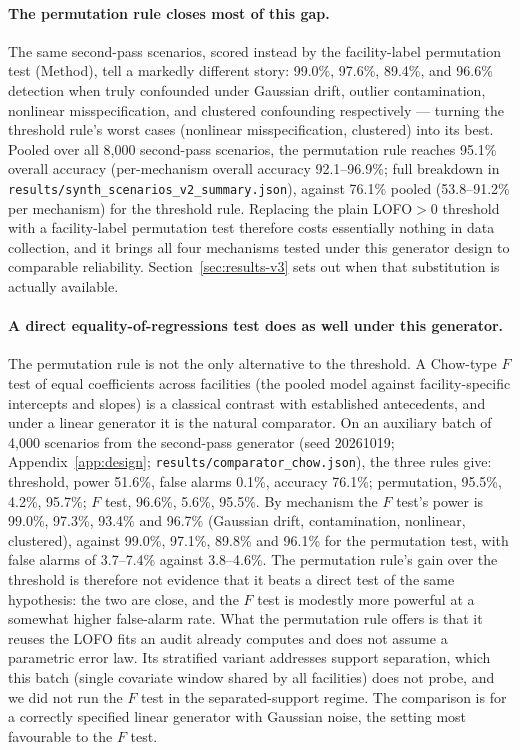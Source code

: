\documentclass[journal=dce]{CUP-JNL-DTM}%
\begin{document}
\paragraph{The permutation rule closes most of this gap.} The same second-pass scenarios, scored instead by the facility-label permutation test (Method), tell a markedly different story: 99.0\%, 97.6\%, 89.4\%, and 96.6\% detection when truly confounded under Gaussian drift, outlier contamination, nonlinear misspecification, and clustered confounding respectively --- turning the threshold rule's worst cases (nonlinear misspecification, clustered) into its best. Pooled over all 8,000 second-pass scenarios, the permutation rule reaches 95.1\% overall accuracy (per-mechanism overall accuracy 92.1--96.9\%; full breakdown in \texttt{results/synth\_scenarios\_v2\_summary.json}), against 76.1\% pooled (53.8--91.2\% per mechanism) for the threshold rule. Replacing the plain LOFO$>0$ threshold with a facility-label permutation test therefore costs essentially nothing in data collection, and it brings all four mechanisms tested under this generator design to comparable reliability. Section~\ref{sec:results-v3} sets out when that substitution is actually available.

\paragraph{A direct equality-of-regressions test does as well under this generator.} The permutation rule is not the only alternative to the threshold. A Chow-type $F$ test of equal coefficients across facilities (the pooled model against facility-specific intercepts and slopes) is a classical contrast with established antecedents, and under a linear generator it is the natural comparator. On an auxiliary batch of 4,000 scenarios from the second-pass generator (seed 20261019; Appendix~\ref{app:design}; \texttt{results/comparator\_chow.json}), the three rules give: threshold, power 51.6\%, false alarms 0.1\%, accuracy 76.1\%; permutation, 95.5\%, 4.2\%, 95.7\%; $F$ test, 96.6\%, 5.6\%, 95.5\%. By mechanism the $F$ test's power is 99.0\%, 97.3\%, 93.4\% and 96.7\% (Gaussian drift, contamination, nonlinear, clustered), against 99.0\%, 97.1\%, 89.8\% and 96.1\% for the permutation test, with false alarms of 3.7--7.4\% against 3.8--4.6\%. The permutation rule's gain over the threshold is therefore not evidence that it beats a direct test of the same hypothesis: the two are close, and the $F$ test is modestly more powerful at a somewhat higher false-alarm rate. What the permutation rule offers is that it reuses the LOFO fits an audit already computes and does not assume a parametric error law. Its stratified variant addresses support separation, which this batch (single covariate window shared by all facilities) does not probe, and we did not run the $F$ test in the separated-support regime. The comparison is for a correctly specified linear generator with Gaussian noise, the setting most favourable to the $F$ test.
\end{document}
